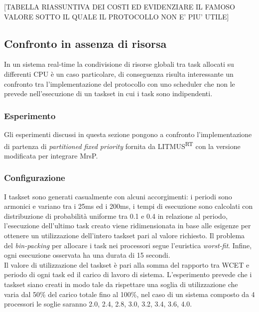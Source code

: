 [TABELLA RIASSUNTIVA DEI COSTI ED EVIDENZIARE IL FAMOSO VALORE SOTTO IL QUALE IL PROTOCOLLO NON E' PIU' UTILE]

\subsection{Confronto in assenza di risorsa}
\label{sec:confronto_norisorsa}

\noindent In un sistema real-time la condivisione di risorse globali tra task allocati su differenti CPU è un caso particolare, di conseguenza risulta interessante un confronto tra l'implementazione del protocollo con uno scheduler che non le prevede nell'esecuzione di un taskset in cui i task sono indipendenti.

\subsubsection{Esperimento}
\label{sec:confronto_norisorsa_exp}

\noindent Gli esperimenti discussi in questa sezione pongono a confronto l'implementazione di partenza di \textit{partitioned fixed priority} fornita da LITMUS\textsuperscript{RT} con la versione modificata per integrare MrsP.

\subsubsection{Configurazione}
\label{sec:confronto_norisorsa_conf}

\noindent I taskset sono generati casualmente con alcuni accorgimenti: i periodi sono armonici e variano tra i 25ms ed i 200ms, i tempi di esecuzione sono calcolati con distribuzione di probabilità uniforme tra 0.1 e 0.4 in relazione al periodo, l'esecuzione dell'ultimo task creato viene ridimensionata in base alle esigenze per ottenere un utilizzazione dell'intero taskset pari al valore richiesto. Il problema del \textit{bin-packing} per allocare i task nei processori segue l'euristica \textit{worst-fit}. Infine, ogni esecuzione osservata ha una durata di 15 secondi.\\

\noindent Il valore di utilizzazione del taskset è pari alla somma del rapporto tra WCET e periodo di ogni task ed il carico di lavoro di sistema. L'esperimento prevede che i taskset siano creati in modo tale da rispettare una soglia di utilizzazione che varia dal 50\% del carico totale fino al 100\%, nel caso di un sistema composto da 4 processori le soglie saranno 2.0, 2.4, 2.8, 3.0, 3.2, 3.4, 3.6, 4.0.

